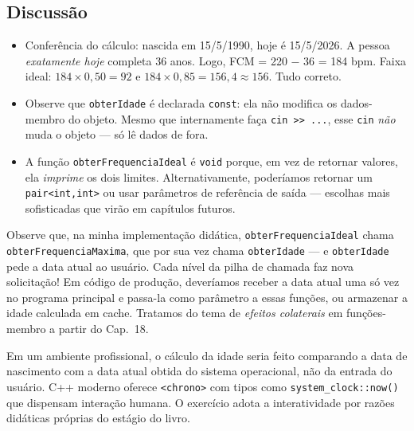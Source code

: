 \documentclass[11pt,a4paper]{article}
\begin{document}
\subsection*{Discuss\~ao}

\begin{itemize}[leftmargin=*]
  \item Confer\^encia do c\'alculo: nascida em 15/5/1990, hoje \'e 15/5/2026. A pessoa \emph{exatamente hoje} completa 36 anos. Logo, FCM = 220 $-$ 36 = 184 bpm. Faixa ideal: $184 \times 0{,}50 = 92$ e $184 \times 0{,}85 = 156{,}4 \approx 156$. Tudo correto.
  \item Observe que \texttt{obterIdade} \'e declarada \texttt{const}: ela n\~ao modifica os dados-membro do objeto. Mesmo que internamente fa\c{c}a \texttt{cin >> ...}, esse \texttt{cin} \emph{n\~ao} muda o objeto --- s\'o l\^e dados de fora.
  \item A fun\c{c}\~ao \texttt{obterFrequenciaIdeal} \'e \texttt{void} porque, em vez de retornar valores, ela \emph{imprime} os dois limites. Alternativamente, poder\'iamos retornar um \texttt{pair<int,int>} ou usar par\^ametros de refer\^encia de sa\'ida --- escolhas mais sofisticadas que vir\~ao em cap\'itulos futuros.
\end{itemize}

\begin{errocomum}
Observe que, na minha implementa\c{c}\~ao did\'atica, \texttt{obterFrequenciaIdeal} chama \texttt{obterFrequenciaMaxima}, que por sua vez chama \texttt{obterIdade} --- e \texttt{obterIdade} pede a data atual ao usu\'ario. Cada n\'ivel da pilha de chamada faz nova solicita\c{c}\~ao! Em c\'odigo de produ\c{c}\~ao, dever\'iamos receber a data atual uma s\'o vez no programa principal e passa-la como par\^ametro a essas fun\c{c}\~oes, ou armazenar a idade calculada em cache. Tratamos do tema de \emph{efeitos colaterais} em fun\c{c}\~oes-membro a partir do Cap.~18.
\end{errocomum}

\begin{obseng}
Em um ambiente profissional, o c\'alculo da idade seria feito comparando a data de nascimento com a data atual obtida do sistema operacional, n\~ao da entrada do usu\'ario. C++ moderno oferece \texttt{<chrono>} com tipos como \texttt{system\_clock::now()} que dispensam intera\c{c}\~ao humana. O exerc\'icio adota a interatividade por raz\~oes did\'aticas pr\'oprias do est\'agio do livro.
\end{obseng}

\newpage
\end{document}
